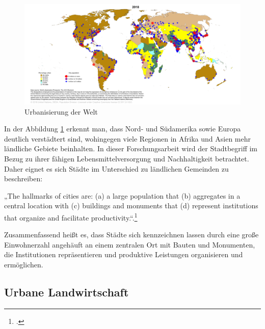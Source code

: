 \documentclass{scrartcl}
\begin{document}
\begin{figure}[htbp]
\centering
\hspace*{-3cm}   
\includegraphics[width=20cm]{image_folder/CityPop_Urban.png}
\caption{Urbanisierung der Welt}
\label{figUrban}
\end{figure}

\FloatBarrier
In der Abbildung \ref{figUrban} erkennt man, dass Nord- und Südamerika sowie Europa deutlich verstädtert sind, wohingegen viele Regionen in Afrika und Asien mehr ländliche Gebiete beinhalten. In dieser Forschungsarbeit wird der Stadtbegriff im Bezug zu ihrer fähigen Lebensmittelversorgung und Nachhaltigkeit betrachtet. Daher eignet es sich Städte im Unterschied zu ländlichen Gemeinden zu beschreiben: 

\begin{displayquote} 
„The hallmarks of cities are: (a) a large population that (b) aggregates in a central location with (c) buildings and monuments that (d) represent institutions that organize and facilitate productivity.“.\footcite[S.16]{Elmqvist2013} 
\end{displayquote}  

Zusammenfassend heißt es, dass Städte sich kennzeichnen lassen durch eine große Einwohnerzahl angehäuft an einem zentralen Ort mit Bauten und Monumenten, die Institutionen repräsentieren und produktive Leistungen organisieren und ermöglichen.

\subsection{Urbane Landwirtschaft}
\end{document}
